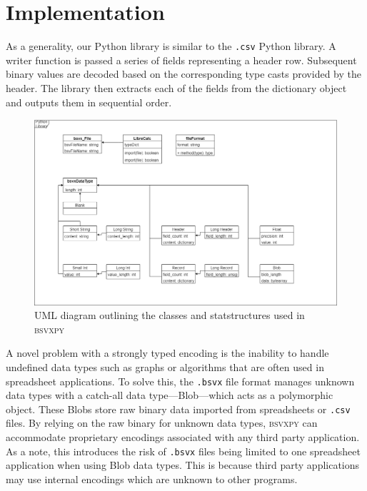 \documentclass[10pt]{article}
\begin{document}
\section*{Implementation}

As a generality, our Python library is similar to the \texttt{.csv} Python library.
A writer function is passed a series of fields representing a header row. 
Subsequent binary values are decoded based on the corresponding type casts provided by the header.
The library then extracts each of the fields from the dictionary object and outputs them in sequential order.

\begin{figure}[H]
\centering
\includegraphics[width=\textwidth]{figures/bsvxpy.png}
\caption{UML diagram outlining the classes and statstructures used in \textsc{bsvxpy}}
\label{fig:bsvxpy_architecture}
\end{figure}

\indent{}
A novel problem with a strongly typed encoding is the inability to handle undefined data types such as graphs or algorithms that are often used in spreadsheet applications.
To solve this, the \texttt{.bsvx} file format manages unknown data types with a catch-all data type---Blob---which acts as a polymorphic object.
These Blobs store raw binary data imported from spreadsheets or \texttt{.csv} files.
By relying on the raw binary for unknown data types, \textsc{bsvxpy} can accommodate proprietary encodings associated with any third party application.
As a note, this introduces the risk of \texttt{.bsvx} files being limited to one spreadsheet application when using Blob data types.
This is because third party applications may use internal encodings which are unknown to other programs.
\end{document}
